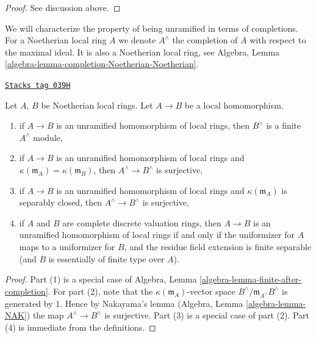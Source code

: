 \begin{proof}
See discussion above.
\end{proof}

We will characterize the property of being unramified in terms
of completions. For a Noetherian local ring $A$
we denote $A^\wedge$ the completion of $A$ with respect to the
maximal ideal. It is also a Noetherian local ring, see
Algebra, Lemma \ref{algebra-lemma-completion-Noetherian-Noetherian}.

\begin{lemma}
\label{etale-lemma-unramified-completions}
\href{https://stacks.math.columbia.edu/tag/039H}{\texttt{Stacks tag 039H}}

Let $A$, $B$ be Noetherian local rings.
Let $A \to B$ be a local homomorphism.
\begin{enumerate}
\item if $A \to B$ is an unramified homomorphism of local rings,
then $B^\wedge$ is a finite $A^\wedge$ module,
\item if $A \to B$ is an unramified homomorphism of local rings and
$\kappa(\mathfrak m_A) = \kappa(\mathfrak m_B)$,
then $A^\wedge \to B^\wedge$ is surjective,
\item if $A \to B$ is an unramified homomorphism of local rings
and $\kappa(\mathfrak m_A)$
is separably closed, then $A^\wedge \to B^\wedge$ is surjective,
\item if $A$ and $B$ are complete discrete valuation rings, then
$A \to B$ is an unramified homomorphism of local rings
if and only if the uniformizer for $A$ maps to a uniformizer for $B$,
and the residue field extension is finite separable (and $B$ is
essentially of finite type over $A$).
\end{enumerate}
\end{lemma}

\begin{proof}
Part (1) is a special case of
Algebra, Lemma \ref{algebra-lemma-finite-after-completion}.
For part (2), note that the $\kappa(\mathfrak m_A)$-vector space
$B^\wedge/\mathfrak m_{A^\wedge}B^\wedge$
is generated by $1$. Hence by Nakayama's lemma
(Algebra, Lemma \ref{algebra-lemma-NAK}) the map
$A^\wedge \to B^\wedge$ is surjective.
Part (3) is a special case of part (2).
Part (4) is immediate from the definitions.
\end{proof}

